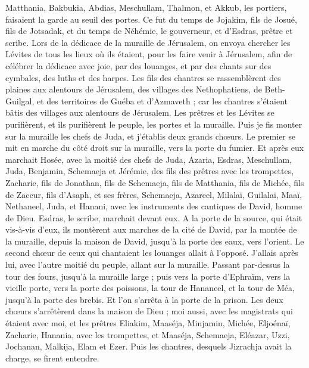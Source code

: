 \begin{multicols}{2}
Matthania, Bakbukia, Abdias, Meschullam, Thalmon, et Akkub, les portiers, faisaient la garde au seuil des portes.
Ce fut du temps de Jojakim, fils de Josué, fils de Jotsadak, et du temps de Néhémie, le gouverneur, et d'Esdras, prêtre et scribe.
Lors de la dédicace de la muraille de Jérusalem, on envoya chercher les Lévites de tous les lieux où ils étaient, pour les faire venir à Jérusalem, afin de célébrer la dédicace avec joie, par des louanges, et par des chants sur des cymbales, des luths et des harpes.
Les fils des chantres se rassemblèrent des plaines aux alentours de Jérusalem, des villages des Nethophatiens,
de Beth-Guilgal, et des territoires de Guéba et d'Azmaveth ; car les chantres s'étaient bâtis des villages aux alentours de Jérusalem.
Les prêtres et les Lévites se purifièrent, et ils purifièrent le peuple, les portes et la muraille.
Puis je fis monter sur la muraille les chefs de Juda, et j'établis deux grands chœurs. Le premier se mit en marche du côté droit sur la muraille, vers la porte du fumier.
Et après eux marchait Hosée, avec la moitié des chefs de Juda,
Azaria, Esdras, Meschullam,
Juda, Benjamin, Schemaeja et Jérémie,
des fils des prêtres avec les trompettes, Zacharie, fils de Jonathan, fils de Schemaeja, fils de Matthania, fils de Michée, fils de Zaccur, fils d'Asaph,
et ses frères, Schemaeja, Azareel, Milalaï, Guilalaï, Maaï, Nethaneel, Juda, et Hanani, avec les instruments des cantiques de David, homme de Dieu. Esdras, le scribe, marchait devant eux.
A la porte de la source, qui était vis-à-vis d'eux, ils montèrent aux marches de la cité de David, par la montée de la muraille, depuis la maison de David, jusqu'à la porte des eaux, vers l'orient.
Le second chœur de ceux qui chantaient les louanges allait à l'opposé. J'allais après lui, avec l'autre moitié du peuple, allant sur la muraille. Passant par-dessus la tour des fours, jusqu'à la muraille large ;
puis vers la porte d'Ephraïm, vers la vieille porte, vers la porte des poissons, la tour de Hananeel, et la tour de Méa, jusqu'à la porte des brebis. Et l'on s'arrêta à la porte de la prison.
Les deux chœurs s'arrêtèrent dans la maison de Dieu ; moi aussi, avec les magistrats qui étaient avec moi,
et les prêtres Eliakim, Maaséja, Minjamin, Michée, Eljoénaï, Zacharie, Hanania, avec les trompettes,
et Maaséja, Schemaeja, Eléazar, Uzzi, Jochanan, Malkija, Elam et Ezer. Puis les chantres, desquels Jizrachja avait la charge, se firent entendre.

\end{multicols}
